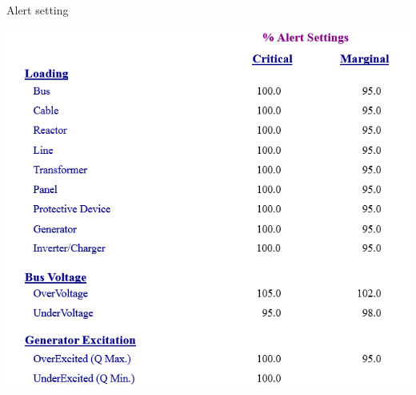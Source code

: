 \begin{table}[!htb]
	\caption{Alert setting}
	\label{tbl_ch04_elecaudit_load_flow_alertsetting01}
	\includegraphics[scale=0.4]{tables/tbl_ch04_elecaudit_load_flow_alertsetting01}
\end{table}


